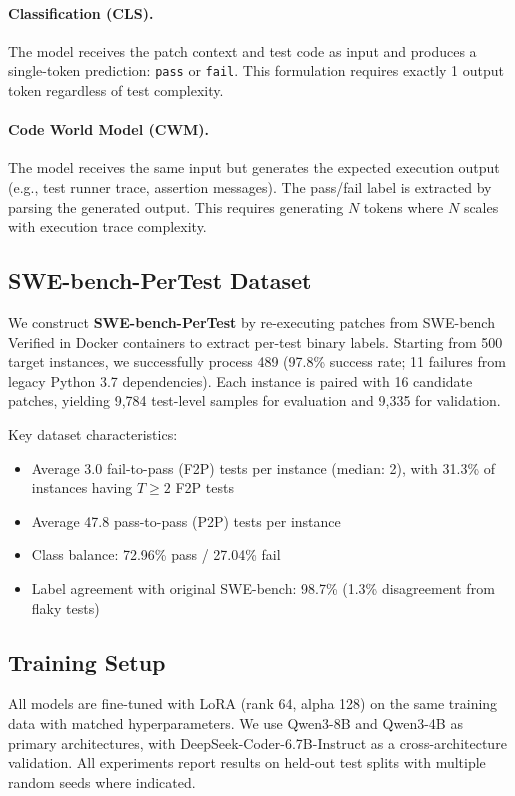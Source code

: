 \documentclass[11pt]{article}
\begin{document}
\paragraph{Classification (CLS).} The model receives the patch context and test code as input and produces a single-token prediction: \texttt{pass} or \texttt{fail}. This formulation requires exactly 1 output token regardless of test complexity.

\paragraph{Code World Model (CWM).} The model receives the same input but generates the expected execution output (e.g., test runner trace, assertion messages). The pass/fail label is extracted by parsing the generated output. This requires generating $N$ tokens where $N$ scales with execution trace complexity.

\subsection{SWE-bench-PerTest Dataset}

We construct \textbf{SWE-bench-PerTest} by re-executing patches from SWE-bench Verified in Docker containers to extract per-test binary labels. Starting from 500 target instances, we successfully process 489 (97.8\% success rate; 11 failures from legacy Python 3.7 dependencies). Each instance is paired with 16 candidate patches, yielding 9,784 test-level samples for evaluation and 9,335 for validation.

Key dataset characteristics:
\begin{itemize}
    \item Average 3.0 fail-to-pass (F2P) tests per instance (median: 2), with 31.3\% of instances having $T \geq 2$ F2P tests
    \item Average 47.8 pass-to-pass (P2P) tests per instance
    \item Class balance: 72.96\% pass / 27.04\% fail
    \item Label agreement with original SWE-bench: 98.7\% (1.3\% disagreement from flaky tests)
\end{itemize}

\subsection{Training Setup}

All models are fine-tuned with LoRA (rank 64, alpha 128) on the same training data with matched hyperparameters. We use Qwen3-8B and Qwen3-4B as primary architectures, with DeepSeek-Coder-6.7B-Instruct as a cross-architecture validation. All experiments report results on held-out test splits with multiple random seeds where indicated.
\end{document}
